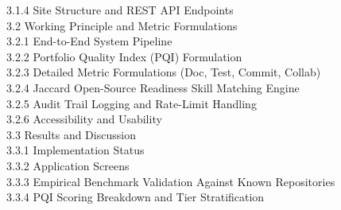\documentclass[12pt,a4paper]{article}
\begin{document}
\hspace*{1.2cm} 3.1.4 \hspace{0.2cm} Site Structure and REST API Endpoints  \\
\hspace*{0.6cm} 3.2 \hspace{0.2cm} Working Principle and Metric Formulations  \\
\hspace*{1.2cm} 3.2.1 \hspace{0.2cm} End-to-End System Pipeline  \\
\hspace*{1.2cm} 3.2.2 \hspace{0.2cm} Portfolio Quality Index (PQI) Formulation  \\
\hspace*{1.2cm} 3.2.3 \hspace{0.2cm} Detailed Metric Formulations (Doc, Test, Commit, Collab)  \\
\hspace*{1.2cm} 3.2.4 \hspace{0.2cm} Jaccard Open-Source Readiness Skill Matching Engine  \\
\hspace*{1.2cm} 3.2.5 \hspace{0.2cm} Audit Trail Logging and Rate-Limit Handling  \\
\hspace*{1.2cm} 3.2.6 \hspace{0.2cm} Accessibility and Usability  \\
\hspace*{0.6cm} 3.3 \hspace{0.2cm} Results and Discussion  \\
\hspace*{1.2cm} 3.3.1 \hspace{0.2cm} Implementation Status  \\
\hspace*{1.2cm} 3.3.2 \hspace{0.2cm} Application Screens  \\
\hspace*{1.2cm} 3.3.3 \hspace{0.2cm} Empirical Benchmark Validation Against Known Repositories  \\
\hspace*{1.2cm} 3.3.4 \hspace{0.2cm} PQI Scoring Breakdown and Tier Stratification  \\
\end{document}
